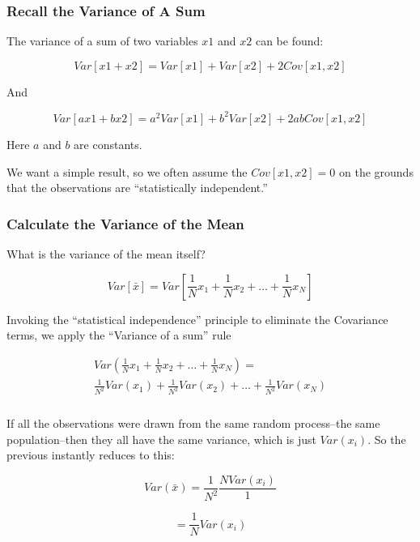 \documentclass[10pt,english]{beamer}
\begin{document}
\begin{frame}
  \frametitle{Recall the Variance of A Sum}

The variance of a sum of two variables $x1$ and $x2$ can be found:

\begin{equation}
Var[x1+x2] = Var[x1]+ Var[x2] + 2Cov[x1,x2]\label{eq:VarianceX1X2}\end{equation}

And

\begin{equation}
Var[ax1+bx2]=a^{2} Var[x1]+b^{2} Var[x2] + 2abCov[x1,x2]\label{eq:VarianceOfSum}\end{equation}

Here $a$ and $b$ are constants. 

We want a simple result, so we often assume the $Cov[x1,x2]=0$
on the grounds that the observations are {}``statistically independent.''

\end{frame}

\begin{frame}
  \frametitle{Calculate the Variance of the Mean}

What is the variance of the mean itself?

\begin{equation}
Var[\bar{x}]=Var[\frac{1}{N}x_{1}+\frac{1}{N}x_{2}+\ldots+\frac{1}{N}x_{N}]\label{eq:VarOfMean1}\end{equation}


Invoking the ``statistical independence'' principle to eliminate
the Covariance terms, we apply the ``Variance of a sum'' rule

\begin{eqnarray}
Var(\frac{1}{N}x_{1}+\frac{1}{N}x_{2}+\ldots+\frac{1}{N}x_{N})= \\
  \frac{1}{N^{2}}Var(x_{1})+\frac{1}{N^{2}}Var(x_{2})+\ldots+\frac{1}{N^{2}}Var(x_{N})\label{eq:VarOfMean2}\end{eqnarray}

\end{frame}

\begin{frame}
  \frametitle{}
  

If all the observations were drawn from the same random process--the
same population--then they all have the same variance, which is just
$Var(x_{i})$. So the previous instantly reduces to this:

\begin{equation}
Var(\bar{x})=\frac{1}{N^{2}}\frac{NVar(x_{i})}{1}\label{eq:-8}\end{equation}


\begin{equation}
=\frac{1}{N}Var(x_{i})\label{eq:varN}
\end{equation}

\end{frame}
\end{document}
